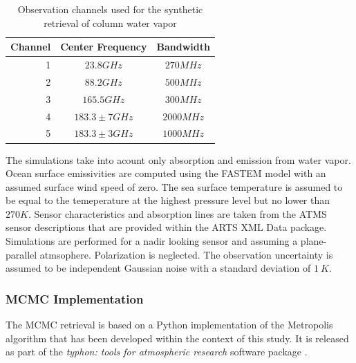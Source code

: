 \documentclass[journal abbreviation, manuscript]{copernicus}
\begin{document}
\begin{table}[hbpt]
\centering
\begin{tabular}{|r|c|c|}
    \hline
    Channel & Center Frequency           & Bandwidth                \\ 
    \hline
                  1 & $23.8 \unit{GHz}$ & $270 \unit{MHz}$ \\
                  2 & $88.2 \unit{GHz}$ & $500 \unit{MHz}$ \\
                  3 & $165.5\unit{GHz}$ & $300 \unit{MHz}$ \\
                  4 & $183.3 \pm 7 \unit{GHz}$ & $2000\unit{MHz}$ \\
                  5 & $183.3 \pm 3 \unit{GHz}$ & $1000\unit{MHz}$ \\
    \hline
\end{tabular}
\caption{Observation channels used for the synthetic retrieval of column water vapor}
\label{tab:channels}
\end{table}

   The simulations take into acount only absorption and emission from water
   vapor. Ocean surface emissivities are computed using the FASTEM \cite{fastem}
   model with an assumed surface wind speed of zero. The sea surface temperature
   is assumed to be equal to the temeperature at the highest pressure level but
   no lower than $270\unit{K}$. Sensor characteristics and absorption lines are
   taken from the ATMS sensor descriptions that are provided within the ARTS XML
   Data package. Simulations are performed for a nadir looking sensor and
   assuming a plane-parallel atmsophere. Polarization is neglected. The
   observation uncertainty is assumed to be independent Gaussian noise with a
   standard deviation of $1\:\unit{K}$.


\subsubsection{MCMC Implementation}

  The MCMC retrieval is based on a Python implementation of the Metropolis
  algorithm \citep[Ch. 12]{bda} that has been developed within the context of
  this study. It is released as part of the \textit{typhon: tools for atmospheric
  research} software package \citep{typhon}.
\end{document}
